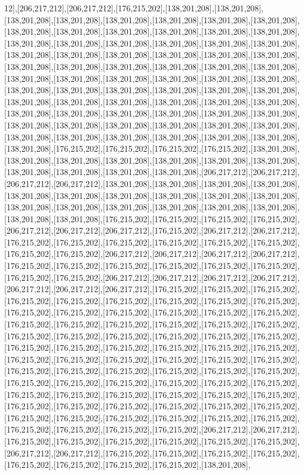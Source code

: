 12],[206,217,212],[206,217,212],[176,215,202],[138,201,208],[138,201,208],[138,201,208],[138,201,208],[138,201,208],[138,201,208],[138,201,208],[138,201,208],[138,201,208],[138,201,208],[138,201,208],[138,201,208],[138,201,208],[138,201,208],[138,201,208],[138,201,208],[138,201,208],[138,201,208],[138,201,208],[138,201,208],[138,201,208],[138,201,208],[138,201,208],[138,201,208],[138,201,208],[138,201,208],[138,201,208],[138,201,208],[138,201,208],[138,201,208],[138,201,208],[138,201,208],[138,201,208],[138,201,208],[138,201,208],[138,201,208],[138,201,208],[138,201,208],[138,201,208],[138,201,208],[138,201,208],[138,201,208],[138,201,208],[138,201,208],[138,201,208],[138,201,208],[138,201,208],[138,201,208],[138,201,208],[138,201,208],[138,201,208],[138,201,208],[138,201,208],[138,201,208],[138,201,208],[138,201,208],[138,201,208],[138,201,208],[138,201,208],[138,201,208],[138,201,208],[138,201,208],[138,201,208],[138,201,208],[138,201,208],[138,201,208],[138,201,208],[138,201,208],[138,201,208],[176,215,202],[176,215,202],[176,215,202],[176,215,202],[138,201,208],[138,201,208],[138,201,208],[138,201,208],[138,201,208],[138,201,208],[138,201,208],[138,201,208],[138,201,208],[138,201,208],[138,201,208],[206,217,212],[206,217,212],[206,217,212],[206,217,212],[138,201,208],[138,201,208],[138,201,208],[138,201,208],[138,201,208],[138,201,208],[138,201,208],[138,201,208],[138,201,208],[138,201,208],[138,201,208],[138,201,208],[138,201,208],[138,201,208],[138,201,208],[138,201,208],[138,201,208],[138,201,208],[176,215,202],[176,215,202],[176,215,202],[176,215,202],[206,217,212],[206,217,212],[206,217,212],[176,215,202],[206,217,212],[206,217,212],[176,215,202],[176,215,202],[176,215,202],[176,215,202],[176,215,202],[176,215,202],[176,215,202],[176,215,202],[206,217,212],[206,217,212],[206,217,212],[206,217,212],[176,215,202],[176,215,202],[176,215,202],[176,215,202],[176,215,202],[176,215,202],[176,215,202],[176,215,202],[206,217,212],[206,217,212],[206,217,212],[206,217,212],[206,217,212],[206,217,212],[206,217,212],[176,215,202],[176,215,202],[176,215,202],[176,215,202],[176,215,202],[176,215,202],[176,215,202],[176,215,202],[176,215,202],[176,215,202],[176,215,202],[176,215,202],[176,215,202],[176,215,202],[176,215,202],[176,215,202],[176,215,202],[176,215,202],[176,215,202],[176,215,202],[176,215,202],[176,215,202],[176,215,202],[176,215,202],[176,215,202],[176,215,202],[176,215,202],[176,215,202],[176,215,202],[176,215,202],[176,215,202],[176,215,202],[176,215,202],[176,215,202],[176,215,202],[176,215,202],[176,215,202],[176,215,202],[176,215,202],[176,215,202],[176,215,202],[176,215,202],[176,215,202],[176,215,202],[176,215,202],[176,215,202],[176,215,202],[176,215,202],[176,215,202],[176,215,202],[176,215,202],[176,215,202],[176,215,202],[176,215,202],[176,215,202],[176,215,202],[176,215,202],[176,215,202],[176,215,202],[176,215,202],[176,215,202],[176,215,202],[176,215,202],[176,215,202],[176,215,202],[176,215,202],[176,215,202],[176,215,202],[176,215,202],[176,215,202],[176,215,202],[176,215,202],[176,215,202],[206,217,212],[206,217,212],[176,215,202],[176,215,202],[176,215,202],[176,215,202],[176,215,202],[176,215,202],[206,217,212],[206,217,212],[176,215,202],[176,215,202],[176,215,202],[176,215,202],[176,215,202],[176,215,202],[176,215,202],[176,215,202],[138,201,208],